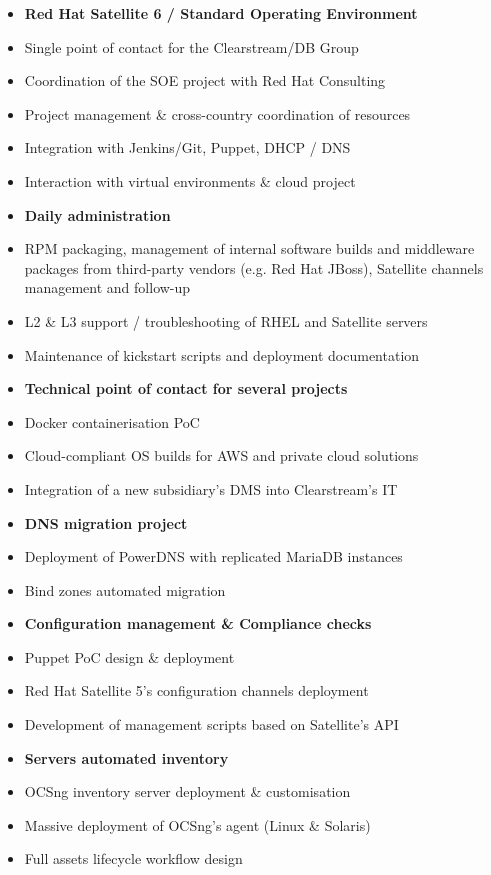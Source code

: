 \documentclass[10pt,a4paper]{altacv}
\begin{document}
\begin{itemize}
\item \textbf{Red Hat Satellite 6 / Standard Operating Environment}
\setlength{\itemindent}{.2in}
\item Single point of contact for the Clearstream/DB Group
\item Coordination of the SOE project with Red Hat Consulting
\item Project management \& cross-country coordination of resources
\setlength{\itemindent}{.4in}
\item Integration with Jenkins/Git, Puppet, DHCP / DNS
\item Interaction with virtual environments \& cloud project
\setlength{\itemindent}{0in}
\item \textbf{Daily administration}
\setlength{\itemindent}{.2in}
\item RPM packaging, management of internal software builds and middleware packages from third-party vendors (e.g. Red Hat JBoss), Satellite channels management and follow-up
\item L2 \& L3 support / troubleshooting of RHEL and Satellite servers
\item Maintenance of kickstart scripts and deployment documentation
\setlength{\itemindent}{0in}
\item \textbf{Technical point of contact for several projects}
\setlength{\itemindent}{.2in}
\item Docker containerisation PoC
\item Cloud-compliant OS builds for AWS and private cloud solutions
\item Integration of a new subsidiary's DMS into Clearstream's IT
\setlength{\itemindent}{0in}
\item \textbf{DNS migration project}
\setlength{\itemindent}{.2in}
\item Deployment of PowerDNS with replicated MariaDB instances
\item Bind zones automated migration
\setlength{\itemindent}{0in}
\item \textbf{Configuration management \& Compliance checks}
\setlength{\itemindent}{.2in}
\item Puppet PoC design \& deployment
\item Red Hat Satellite 5's configuration channels deployment
\item Development of management scripts based on Satellite's API
\setlength{\itemindent}{0in}
\item \textbf{Servers automated inventory}
\setlength{\itemindent}{.2in}
\item OCSng inventory server deployment \& customisation
\item Massive deployment of OCSng's agent (Linux \& Solaris)
\item Full assets lifecycle workflow design
\end{itemize}
\end{document}
